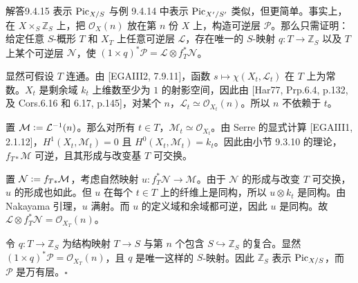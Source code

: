 \begin{origstatement}{解答}{9.4.15}\label{appA:ans9415}
表示 $\operatorname{Pic}_{X/S}$ 与例 9.4.14 中表示 $\operatorname{Pic}_{X'/S'}$ 类似，但更简单。事实上，在 $X\times_S\mathbb Z_S$ 上，把 $\mathcal O_X(n)$ 放在第 $n$ 份 $X$ 上，构造可逆层 $\mathcal P$。那么只需证明：给定任意 $S$-概形 $T$ 和 $X_T$ 上任意可逆层 $\mathcal L$，存在唯一的 $S$-映射 $q\colon T\to\mathbb Z_S$ 以及 $T$ 上某个可逆层 $\mathcal N$，使 $(1\times q)^*\mathcal P=\mathcal L\otimes f_T^*\mathcal N$。

显然可假设 $T$ 连通。由 [EGAIII2, 7.9.11]，函数 $s\mapsto\chi(X_t,\mathcal L_t)$ 在 $T$ 上为常数。$X_t$ 是剩余域 $k_t$ 上维数至少为 $1$ 的射影空间，因此由 [Har77, Prp.6.4, p.132, 及 Cors.6.16 和 6.17, p.145]，对某个 $n$，$\mathcal L_t\simeq\mathcal O_{X_t}(n)$。所以 $n$ 不依赖于 $t$。

置 $\mathcal M\mathrel{\mathop:}=\mathcal L^{-1}(n)$。那么对所有 $t\in T$，$\mathcal M_t\simeq\mathcal O_{X_t}$。由 Serre 的显式计算 [EGAIII1, 2.1.12]，$H^1(X_t,\mathcal M_t)=0$ 且 $H^0(X_t,\mathcal M_t)=k_t$。因此由小节 9.3.10 的理论，$f_{T*}\mathcal M$ 可逆，且其形成与改变基 $T$ 可交换。

置 $\mathcal N\mathrel{\mathop:}= f_{T*}\mathcal M$，考虑自然映射 $u\colon f_T^*\mathcal N\to\mathcal M$。由于 $\mathcal N$ 的形成与改变 $T$ 可交换，$u$ 的形成也如此。但 $u$ 在每个 $t\in T$ 上的纤维上是同构，所以 $u\otimes k_t$ 是同构。由 Nakayama 引理，$u$ 满射。而 $u$ 的定义域和余域都可逆，因此 $u$ 是同构。故 $\mathcal L\otimes f_T^*\mathcal N=\mathcal O_{X_T}(n)$。

令 $q\colon T\to\mathbb Z_S$ 为结构映射 $T\to S$ 与第 $n$ 个包含 $S\hookrightarrow\mathbb Z_S$ 的复合。显然 $(1\times q)^*\mathcal P=\mathcal O_{X_T}(n)$，且 $q$ 是唯一这样的 $S$-映射。因此 $\mathbb Z_S$ 表示 $\operatorname{Pic}_{X/S}$，而 $\mathcal P$ 是万有层。\hfill$\square$
\end{origstatement}

